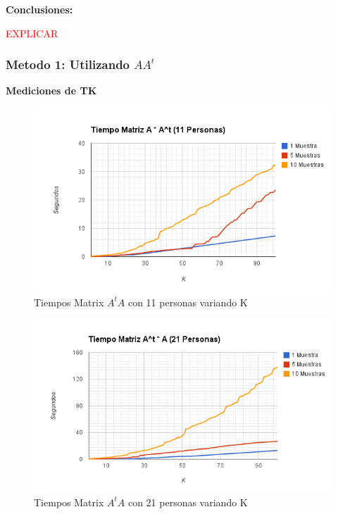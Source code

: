 \textbf{Conclusiones:}

\textcolor{red}{EXPLICAR}


\subsubsection{Metodo 1: Utilizando $AA^t$}

\textbf{Mediciones de TK }

\begin{figure}[H]
\includegraphics[width=1\textwidth]{img/imagea.png}
     \caption{Tiempos Matrix $A^tA$ con 11 personas variando K}
     \label{fig:figura1}
\end{figure}

\begin{figure}[H]
\includegraphics[width=1\textwidth]{img/imageb.png}
     \caption{Tiempos Matrix $A^tA$ con 21 personas variando K}
     \label{fig:figura1}
\end{figure}

